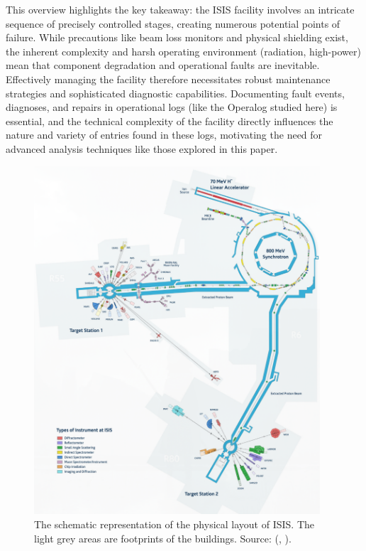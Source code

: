 \documentclass[10pt,oneside]{report}
\renewcommand{\citet}[1]{\citeauthor{#1}, \citeyear{#1}}
\begin{document}
\noindent This overview highlights the key takeaway: the ISIS facility involves an intricate sequence of precisely controlled stages, creating numerous potential points of failure. While precautions like beam loss monitors and physical shielding exist, the inherent complexity and harsh operating environment (radiation, high-power) mean that component degradation and operational faults are inevitable. Effectively managing the facility therefore necessitates robust maintenance strategies and sophisticated diagnostic capabilities. Documenting fault events, diagnoses, and repairs in operational logs (like the Operalog studied here) is essential, and the technical complexity of the facility directly influences the nature and variety of entries found in these logs, motivating the need for advanced analysis techniques like those explored in this paper.


\begin{figure}[htbp]
    \centering
    \includegraphics[width=0.95\textwidth]{ISIS.png}
    \caption{The schematic representation of the physical layout of ISIS. The light grey areas are footprints of the buildings. Source: (\citet{thomason2019isis}).}\label{fig:isis}
\end{figure}
\end{document}
